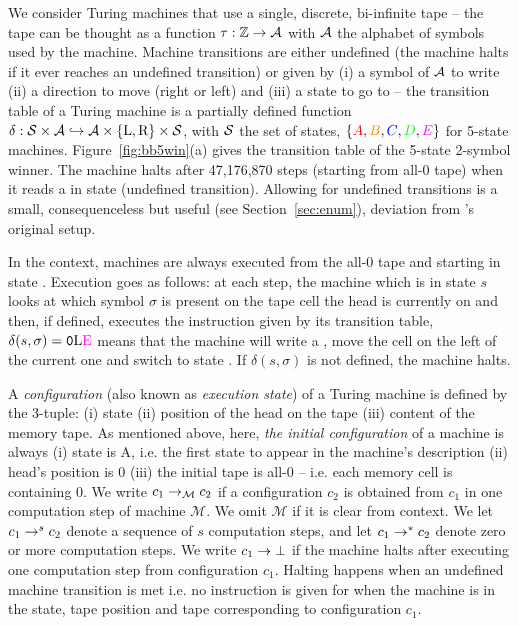 We consider Turing machines that use a single, discrete, bi-infinite tape -- \ie the tape can be thought as a function $\tau: \mathbb{Z} \to \mathcal{A}$ with $\mathcal{A}$ the alphabet of symbols used by the machine. Machine transitions are either undefined (the machine halts if it ever reaches an undefined transition) or given by (i) a symbol of $\mathcal{A}$ to write (ii) a direction to move (right or left) and (iii) a state to go to -- \ie the transition table of a Turing machine is a partially defined function $\delta: \mathcal{S} \times \mathcal{A} \hookrightarrow \mathcal{A} \times \{\text{L},\text{R}\} \times \mathcal{S} $, with $\mathcal{S}$ the set of states, \eg $\{\stateA,\stateB,\stateC,\stateD,\stateE\}$ for 5-state machines. Figure~\ref{fig:bb5win}(a) gives the transition table of the 5-state 2-symbol \BBfull winner. The machine halts after 47,176,870 steps (starting from all-0 tape) when it reads a \szero in state \stateE (undefined transition). Allowing for undefined transitions is a small, consequenceless but useful (see Section~\ref{sec:enum}), deviation from \rado's original setup.

In the \BBfull context, machines are always executed from the all-0 tape and starting in state \stateA. Execution goes as follows: at each step, the machine which is in state $s$ looks at which symbol $\sigma$ is present on the tape cell the head is currently on and then, if defined, executes the instruction given by its transition table, \eg $\delta(s, \sigma) = \szero\text{L}\text{\stateE}$ means that the machine will write a \szero, move the cell on the left of the current one and switch to state \stateE. If $\delta(s, \sigma)$ is not defined, the machine halts.



A \textit{configuration} (also known as \textit{execution state}) of a Turing machine is defined by the 3-tuple: (i) state (ii) position of the head on the tape (iii) content of the memory tape. As mentioned above, here, \textit{the initial configuration} of a machine is always (i) state is A, i.e. the first state to appear in the machine's description (ii) head's position is 0 (iii) the initial tape is all-0 -- i.e. each memory cell is containing 0. We write $c_1 \to_\mathcal{M} c_2$ if a configuration $c_2$ is obtained from $c_1$ in one computation step of machine $\mathcal{M}$. We omit $\mathcal{M}$ if it is clear from context. We let $c_1 \to^s c_2$ denote a sequence of $s$ computation steps, and let $c_1 \to^* c_2$ denote zero or more computation steps. %
We write $c_1 \to \bot$ if the machine halts after executing one computation step from configuration $c_1$. Halting happens when an undefined machine transition is met i.e. no instruction is given for when the machine is in the state, tape position and tape corresponding to configuration $c_1$.

